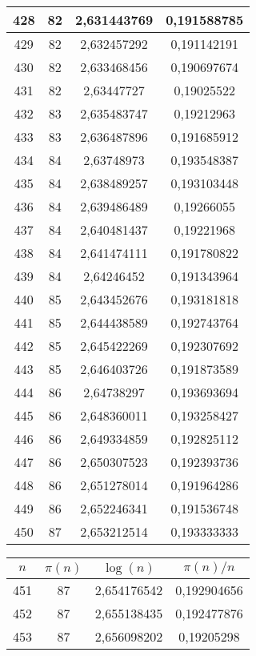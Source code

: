 {\begin{minipage}[!h]{0.45\textwidth}
\begin{longtable}{cccc}
428 & 82 & 2,631443769 & 0,191588785 \\ \hline
429 & 82 & 2,632457292 & 0,191142191 \\ \hline
430 & 82 & 2,633468456 & 0,190697674 \\ \hline
431 & 82 & 2,63447727 & 0,19025522 \\ \hline
432 & 83 & 2,635483747 & 0,19212963 \\ \hline
433 & 83 & 2,636487896 & 0,191685912 \\ \hline
434 & 84 & 2,63748973 & 0,193548387 \\ \hline
435 & 84 & 2,638489257 & 0,193103448 \\ \hline
436 & 84 & 2,639486489 & 0,19266055 \\ \hline
437 & 84 & 2,640481437 & 0,19221968 \\ \hline
438 & 84 & 2,641474111 & 0,191780822 \\ \hline
439 & 84 & 2,64246452 & 0,191343964 \\ \hline
440 & 85 & 2,643452676 & 0,193181818 \\ \hline
441 & 85 & 2,644438589 & 0,192743764 \\ \hline
442 & 85 & 2,645422269 & 0,192307692 \\ \hline
443 & 85 & 2,646403726 & 0,191873589 \\ \hline
444 & 86 & 2,64738297 & 0,193693694 \\ \hline
445 & 86 & 2,648360011 & 0,193258427 \\ \hline
446 & 86 & 2,649334859 & 0,192825112 \\ \hline
447 & 86 & 2,650307523 & 0,192393736 \\ \hline
448 & 86 & 2,651278014 & 0,191964286 \\ \hline
449 & 86 & 2,652246341 & 0,191536748 \\ \hline
450 & 87 & 2,653212514 & 0,193333333 \\ \hline
\end{longtable}
\end{minipage}
\begin{minipage}[!h]{0.45\textwidth}\centering
\tiny
\begin{longtable}{cccc} \hline
\(n\) & \(\pi(n)\) & \(\log(n)\) & \(\pi(n)/n\) \\ \hline
451 & 87 & 2,654176542 & 0,192904656 \\ \hline
452 & 87 & 2,655138435 & 0,192477876 \\ \hline
453 & 87 & 2,656098202 & 0,19205298 \\ \hline

\end{longtable}
\end{minipage}}
